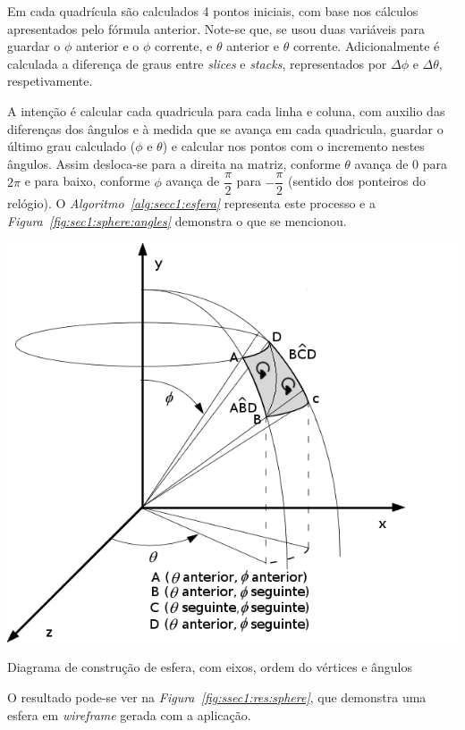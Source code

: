 Em cada quadrícula são calculados 4 pontos iniciais, com base nos cálculos
apresentados pelo fórmula anterior. Note-se que, se usou duas variáveis para
guardar o $\phi$ anterior e o $\phi$ corrente, e $\theta$ anterior  e $\theta$
corrente. Adicionalmente é calculada a diferença de graus entre \emph{slices}
e \emph{stacks}, representados por $\Delta \phi$ e $\Delta \theta$,
respetivamente. 

A intenção é calcular cada quadricula para cada linha e coluna, com auxilio das
diferenças dos ângulos e à medida que se avança em cada quadricula, guardar
o último grau calculado ($\phi$ e $\theta$) e calcular nos pontos com
o incremento nestes ângulos. Assim desloca-se para a direita na matriz, conforme
$\theta$ avança de 0 para $2\pi$ e para baixo, conforme $\phi$ avança de
$\dfrac{\pi}{2}$ para $-\dfrac{\pi}{2}$ (sentido dos ponteiros do relógio).
O \emph{Algoritmo~\ref{alg:secc1:esfera}} representa este processo
e a \emph{Figura~\ref{fig:sec1:sphere:angles}} demonstra o que se
mencionou.  


\begin{center}
 	\includegraphics[width=\textwidth,height=0.5\textheight,keepaspectratio]{resources/esfera2.png}
 	\captionsetup{type=figure, width=0.8\linewidth}
	\caption{Diagrama de construção de esfera, com eixos, ordem do vértices
	e ângulos}
\label{fig:sec1:sphere:angles} 
\end{center}

O resultado pode-se ver na \emph{Figura~\ref{fig:ssec1:res:sphere}}, que
demonstra uma esfera em \emph{wireframe} gerada com a aplicação.  

